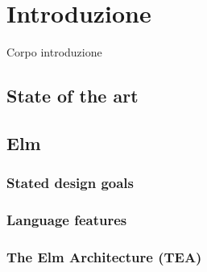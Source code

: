 \chapter{Introduzione}
\setcounter{page}{1}

Corpo introduzione

\section{State of the art}
\section{Elm}
\subsection{Stated design goals}
\subsection{Language features}
\subsection{The Elm Architecture (TEA)}
